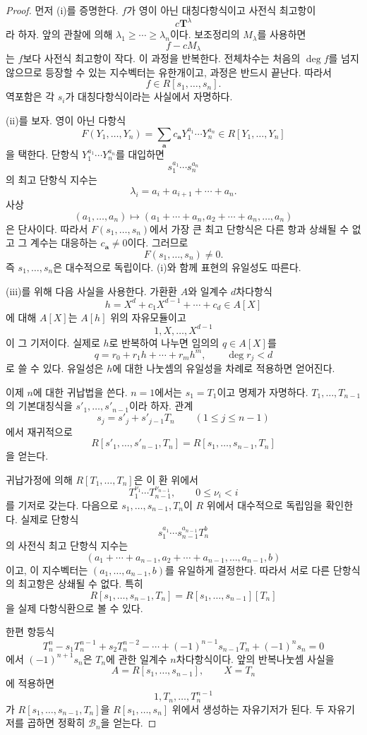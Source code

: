 \begin{proof}
먼저 (i)를 증명한다. $f$가 영이 아닌 대칭다항식이고 사전식 최고항이
\[
  c\mathbf T^\lambda
\]
라 하자. 앞의 관찰에 의해 $\lambda_1\ge\cdots\ge\lambda_n$이다. 보조정리의 $M_\lambda$를 사용하면
\[
  f-cM_\lambda
\]
는 $f$보다 사전식 최고항이 작다. 이 과정을 반복한다. 전체차수는 처음의 $\deg f$를 넘지 않으므로 등장할 수 있는 지수벡터는 유한개이고, 과정은 반드시 끝난다. 따라서
\[
  f\in R[s_1,\dots,s_n].
\]
역포함은 각 $s_i$가 대칭다항식이라는 사실에서 자명하다.

(ii)를 보자. 영이 아닌 다항식
\[
  F(Y_1,\dots,Y_n)=
  \sum_{\mathbf a}c_{\mathbf a}Y_1^{a_1}\cdots Y_n^{a_n}
  \in R[Y_1,\dots,Y_n]
\]
을 택한다. 단항식 $Y_1^{a_1}\cdots Y_n^{a_n}$를 대입하면
\[
  s_1^{a_1}\cdots s_n^{a_n}
\]
의 최고 단항식 지수는
\[
  \lambda_i=a_i+a_{i+1}+\cdots+a_n.
\]
사상
\[
  (a_1,\dots,a_n)\longmapsto
  (a_1+\cdots+a_n,a_2+\cdots+a_n,\dots,a_n)
\]
은 단사이다. 따라서 $F(s_1,\dots,s_n)$에서 가장 큰 최고 단항식은 다른 항과 상쇄될 수 없고 그 계수는 대응하는 $c_{\mathbf a}\ne0$이다. 그러므로
\[
  F(s_1,\dots,s_n)\ne0.
\]
즉 $s_1,\dots,s_n$은 대수적으로 독립이다. (i)와 함께 표현의 유일성도 따른다.

(iii)를 위해 다음 사실을 사용한다. 가환환 $A$와 일계수 $d$차다항식
\[
  h=X^d+c_1X^{d-1}+\cdots+c_d\in A[X]
\]
에 대해 $A[X]$는 $A[h]$ 위의 자유모듈이고
\[
  1,X,\dots,X^{d-1}
\]
이 그 기저이다. 실제로 $h$로 반복하여 나누면 임의의 $q\in A[X]$를
\[
  q=r_0+r_1h+\cdots+r_mh^m,
  \qquad \deg r_j<d
\]
로 쓸 수 있다. 유일성은 $h$에 대한 나눗셈의 유일성을 차례로 적용하면 얻어진다.

이제 $n$에 대한 귀납법을 쓴다. $n=1$에서는 $s_1=T_1$이고 명제가 자명하다. $T_1,\dots,T_{n-1}$의 기본대칭식을 $s'_1,\dots,s'_{n-1}$이라 하자. 관계
\[
  s_j=s'_j+s'_{j-1}T_n
  \qquad(1\le j\le n-1)
\]
에서 재귀적으로
\[
  R[s'_1,\dots,s'_{n-1},T_n]
  =R[s_1,\dots,s_{n-1},T_n]
\]
을 얻는다.

귀납가정에 의해 $R[T_1,\dots,T_n]$은 이 환 위에서
\[
  T_1^{\nu_1}\cdots T_{n-1}^{\nu_{n-1}},
  \qquad 0\le\nu_i<i
\]
를 기저로 갖는다. 다음으로 $s_1,\dots,s_{n-1},T_n$이 $R$ 위에서 대수적으로 독립임을 확인한다. 실제로 단항식
\[
  s_1^{a_1}\cdots s_{n-1}^{a_{n-1}}T_n^b
\]
의 사전식 최고 단항식 지수는
\[
  (a_1+\cdots+a_{n-1},
   a_2+\cdots+a_{n-1},
   \dots,a_{n-1},b)
\]
이고, 이 지수벡터는 $(a_1,\dots,a_{n-1},b)$를 유일하게 결정한다. 따라서 서로 다른 단항식의 최고항은 상쇄될 수 없다. 특히
\[
  R[s_1,\dots,s_{n-1},T_n]
  =R[s_1,\dots,s_{n-1}][T_n]
\]
을 실제 다항식환으로 볼 수 있다.

한편 항등식
\[
  T_n^n-s_1T_n^{n-1}+s_2T_n^{n-2}-\cdots
  +(-1)^{n-1}s_{n-1}T_n+(-1)^ns_n=0
\]
에서 $(-1)^{n+1}s_n$은 $T_n$에 관한 일계수 $n$차다항식이다. 앞의 반복나눗셈 사실을
\[
  A=R[s_1,\dots,s_{n-1}],
  \qquad X=T_n
\]
에 적용하면
\[
  1,T_n,\dots,T_n^{n-1}
\]
가 $R[s_1,\dots,s_{n-1},T_n]$을 $R[s_1,\dots,s_n]$ 위에서 생성하는 자유기저가 된다. 두 자유기저를 곱하면 정확히 $\mathcal B_n$을 얻는다.
\end{proof}

